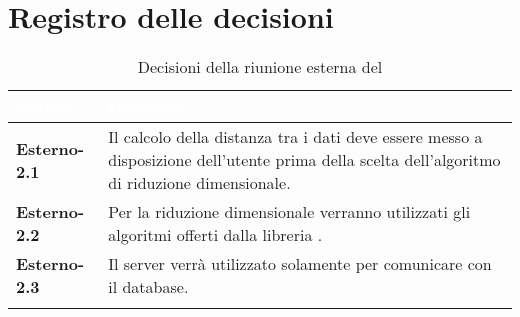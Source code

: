 \section{Registro delle decisioni}
{
\renewcommand{\arraystretch}{1.5}
\centering
\begin{longtable}{C{3cm} C{9cm}}
\textcolor{white}{\textbf{Codice}}&
\textcolor{white}{\textbf{Decisione}}\\	
\endhead
		
\textbf{Esterno-2.1} & Il calcolo della distanza tra i dati deve essere messo a disposizione dell'utente prima della scelta dell'algoritmo di riduzione dimensionale.\\

\textbf{Esterno-2.2} & Per la riduzione dimensionale verranno utilizzati gli algoritmi offerti dalla libreria .\\

\textbf{Esterno-2.3} & Il server verrà utilizzato solamente per comunicare con il database.\\

\caption{Decisioni della riunione esterna del \Data{}}
		
\end{longtable}
}
